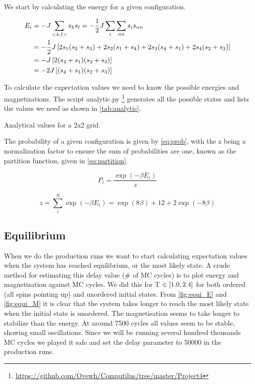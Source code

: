 We start by calculating the energy for a given configuration.

\begin{align*}
  E_i &= -J \sum_{<k,l>} s_k s_l = -\frac{1}{2}J \sum_{i} \sum_{nn} s_i s_{nn} \\
      &= -\frac{1}{2} J \left[2 s_1 (s_2 + s_3) + 2s_2(s_1 + s_4) + 2s_3(s_4 + s_1) + 2s_4 (s_2 + s_3)\right]\\
      &= -J\left[ 2(s_4 + s_1)(s_2 + s_3)\right] \\
      &= -2J\left[(s_4 + s_1)(s_2+s_3)\right]
\end{align*}

To calculate the expectation values we need to know the possible energies and
magnetizations. The script analytic.py
\footnote{\url{https://github.com/Ovewh/Computilus/tree/master/Project4}}
generates all the possible states and lists the values we need as shown in
\cref{tab:analytic}.

\begin{table}[htp]
  \centering
  \caption{Analytical values for a 2x2 grid.}
  \label{tab:analytic}
\end{table}

The probability of a given configuration is given by \cref{eq:prob}, with
the z being a normalization factor to ensure the sum of probabilities are one,
known as the partition function, given in \cref{eq:partition}.


\begin{equation}
  \label{eq:prob}
  P_i = \frac{\exp(-\beta E_i)}{z}
\end{equation}

\begin{equation}
  \label{eq:partition}
  z = \sum_{i}^{N} \exp(-\beta E_i) = \exp(8\beta) + 12 + 2\exp(-8\beta)
\end{equation}




\subsection{Equilibrium}

When we do the production runs we want to start calculating expectation values
when the system has reached equilibrium, or the most likely state. A crude
method for estimating this delay value (\# of MC cycles) is to plot energy and
magnetization against MC cycles. We did this for T $\in \left[1.0,2.4\right]$ for both
ordered (all spins pointing up) and unordered initial states. From
\cref{fig:equi_E} and \cref{fig:equi_M} it is clear that the system takes longer
to reach the most likely state when the initial state is unordered. The
magnetisation seems to take longer to stabilize than the energy. At around 7500
cycles all values seem to be stable, showing small oscillations. Since we will
be running several hundred thousands MC cycles we played it safe and set the
delay parameter to 50000 in the production runs.

